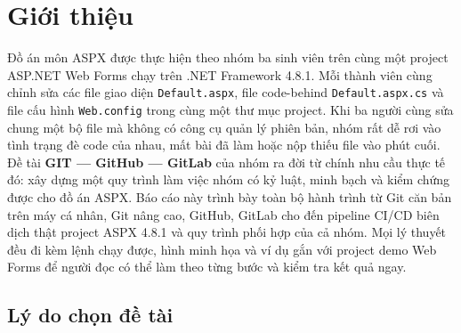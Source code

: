 \section{Giới thiệu}
\label{sec:c1-gioi-thieu}

Đồ án môn ASPX được thực hiện theo nhóm ba sinh viên trên cùng một project ASP.NET Web Forms chạy trên .NET Framework 4.8.1.
Mỗi thành viên cùng chỉnh sửa các file giao diện \texttt{Default.aspx}, file code-behind \texttt{Default.aspx.cs} và file cấu hình \texttt{Web.config} trong cùng một thư mục project.
Khi ba người cùng sửa chung một bộ file mà không có công cụ quản lý phiên bản, nhóm rất dễ rơi vào tình trạng đè code của nhau, mất bài đã làm hoặc nộp thiếu file vào phút cuối.
Đề tài \textbf{GIT --- GitHub --- GitLab} của nhóm ra đời từ chính nhu cầu thực tế đó: xây dựng một quy trình làm việc nhóm có kỷ luật, minh bạch và kiểm chứng được cho đồ án ASPX.
Báo cáo này trình bày toàn bộ hành trình từ Git căn bản trên máy cá nhân, Git nâng cao, GitHub, GitLab cho đến pipeline CI/CD biên dịch thật project ASPX 4.8.1 và quy trình phối hợp của cả nhóm.
Mọi lý thuyết đều đi kèm lệnh chạy được, hình minh họa và ví dụ gắn với project demo Web Forms để người đọc có thể làm theo từng bước và kiểm tra kết quả ngay.

\subsection{Lý do chọn đề tài}

